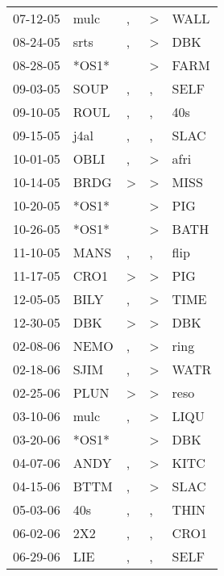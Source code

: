 \begin{supertabular}{lllll}
 07-12-05 &   mulc &                , &     \textgreater &   WALL \\
 08-24-05 &   srts &                , &     \textgreater &    DBK \\
 08-28-05 &  *OS1* &                  &     \textgreater &   FARM \\
 09-03-05 &   SOUP &                , &                , &   SELF \\
 09-10-05 &   ROUL &                , &                , &    40s \\
 09-15-05 &   j4al &                , &                , &   SLAC \\
 10-01-05 &   OBLI &                , &     \textgreater &   afri \\
 10-14-05 &   BRDG &     \textgreater &     \textgreater &   MISS \\
 10-20-05 &  *OS1* &                  &     \textgreater &    PIG \\
 10-26-05 &  *OS1* &                  &     \textgreater &   BATH \\
 11-10-05 &   MANS &                , &                , &   flip \\
 11-17-05 &   CRO1 &     \textgreater &     \textgreater &    PIG \\
 12-05-05 &   BILY &                , &     \textgreater &   TIME \\
 12-30-05 &    DBK &     \textgreater &     \textgreater &    DBK \\
 02-08-06 &   NEMO &                , &     \textgreater &   ring \\
 02-18-06 &   SJIM &                , &     \textgreater &   WATR \\
 02-25-06 &   PLUN &     \textgreater &     \textgreater &   reso \\
 03-10-06 &   mulc &                , &     \textgreater &   LIQU \\
 03-20-06 &  *OS1* &                  &     \textgreater &    DBK \\
 04-07-06 &   ANDY &                , &     \textgreater &   KITC \\
 04-15-06 &   BTTM &                , &     \textgreater &   SLAC \\
 05-03-06 &    40s &                , &                , &   THIN \\
 06-02-06 &    2X2 &                , &                , &   CRO1 \\
 06-29-06 &    LIE &                , &                , &   SELF \\

\end{supertabular}
